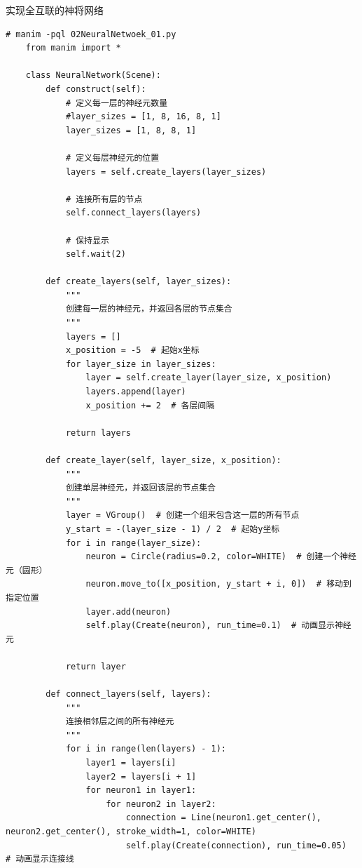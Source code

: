 \begin{example}
    \exProblem
    实现全互联的神将网络
    \exSolution
    \begin{lstlisting}[style=pythonstyle]
    # manim -pql 02NeuralNetwoek_01.py
    from manim import *

    class NeuralNetwork(Scene):
        def construct(self):
            # 定义每一层的神经元数量
            #layer_sizes = [1, 8, 16, 8, 1]
            layer_sizes = [1, 8, 8, 1]
    
            # 定义每层神经元的位置
            layers = self.create_layers(layer_sizes)
    
            # 连接所有层的节点
            self.connect_layers(layers)
    
            # 保持显示
            self.wait(2)
    
        def create_layers(self, layer_sizes):
            """
            创建每一层的神经元，并返回各层的节点集合
            """
            layers = []
            x_position = -5  # 起始x坐标
            for layer_size in layer_sizes:
                layer = self.create_layer(layer_size, x_position)
                layers.append(layer)
                x_position += 2  # 各层间隔
    
            return layers
    
        def create_layer(self, layer_size, x_position):
            """
            创建单层神经元，并返回该层的节点集合
            """
            layer = VGroup()  # 创建一个组来包含这一层的所有节点
            y_start = -(layer_size - 1) / 2  # 起始y坐标
            for i in range(layer_size):
                neuron = Circle(radius=0.2, color=WHITE)  # 创建一个神经元（圆形）
                neuron.move_to([x_position, y_start + i, 0])  # 移动到指定位置
                layer.add(neuron)
                self.play(Create(neuron), run_time=0.1)  # 动画显示神经 元
    
            return layer
    
        def connect_layers(self, layers):
            """
            连接相邻层之间的所有神经元
            """
            for i in range(len(layers) - 1):
                layer1 = layers[i]
                layer2 = layers[i + 1]
                for neuron1 in layer1:
                    for neuron2 in layer2:
                        connection = Line(neuron1.get_center(), neuron2.get_center(), stroke_width=1, color=WHITE)
                        self.play(Create(connection), run_time=0.05)  # 动画显示连接线
    \end{lstlisting}
\end{example}


